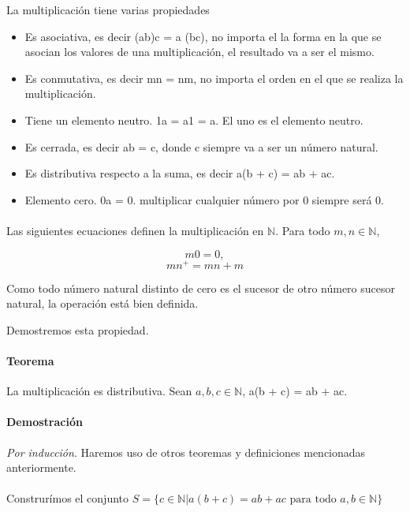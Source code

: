 \documentclass{article}
\begin{document}
La multiplicación tiene varias propiedades

\begin{itemize}
    \item Es asociativa, es decir (ab)c = a (bc), no importa el la forma en la que se asocian los valores de una multiplicación, el resultado va a ser el mismo.
    \item Es conmutativa, es decir mn = nm, no importa el orden en el que se realiza la multiplicación.
    \item Tiene un elemento neutro.  1a = a1 = a. El uno es el elemento neutro.
    \item Es cerrada, es decir ab = c, donde c siempre va a ser un número natural.
    \item Es distributiva respecto a la suma, es decir a(b + c) = ab + ac.
    \item Elemento cero. 0a = 0. multiplicar cualquier número por 0 siempre será 0.
\end{itemize}

\paragraph{}Las siguientes ecuaciones definen la multiplicación en $\mathbb{N}$. Para todo $m,n \in \mathbb{N}$\cite{tnumprincip_2004},

$$m0=0,$$
$$mn^+ = mn + m$$

Como todo número natural distinto de cero es el sucesor de otro número sucesor natural, la operación está bien definida.

Demostremos esta propiedad.

\paragraph{Teorema} La multiplicación es distributiva. Sean $a,b,c \in \mathbb{N}$, a(b + c) = ab + ac.

\paragraph{Demostración} \textit{Por inducción}. Haremos uso de otros teoremas y definiciones mencionadas anteriormente.

\paragraph{} Construrímos el conjunto $S = \{ c \in \mathbb{N}| a(b+c) = ab + ac \text{ para todo } a,b \in \mathbb{N}\}$
\end{document}
